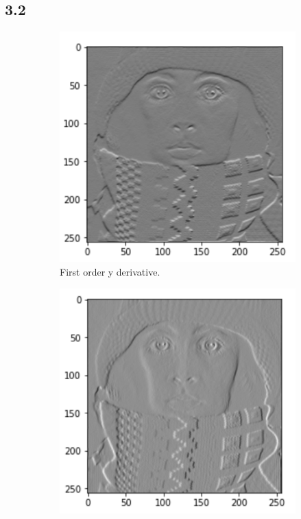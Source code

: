\subsection*{3.2}
\begin{figure}[H]
	\centering
	\begin{subfigure}[b]{0.45\textwidth}
		\centering
		\includegraphics[width=\textwidth]{Materials/3210}
		\caption{First order y derivative.}
	\end{subfigure}
	\hfill
	\begin{subfigure}[b]{0.45\textwidth}
		\centering
		\includegraphics[width=\textwidth]{Materials/3201}

\end{subfigure}
\end{figure}

